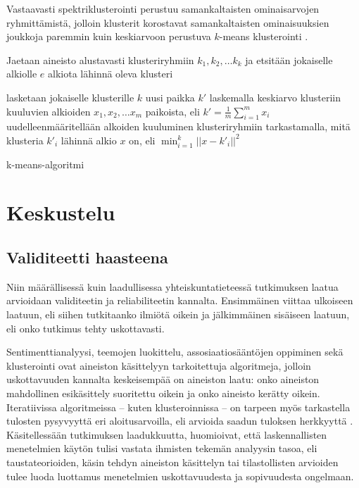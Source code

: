 \documentclass[finnish,gradu,twoside,12pt]{tktltiki}
\begin{document}
{Vastaavasti spektriklusterointi perustuu samankaltaisten ominaisarvojen ryhmittämistä, jolloin klusterit korostavat samankaltaisten ominaisuuksien joukkoja paremmin kuin keskiarvoon perustuva $k$-means klusterointi \citep[485--586]{Hastie2009}.

\begin{algorithm}
\begin{algorithmic}

\State Jaetaan aineisto alustavasti klusteriryhmiin $k_1, k_2, \ldots k_k$ ja etsitään jokaiselle alkiolle $e$ alkiota lähinnä oleva klusteri


\State lasketaan jokaiselle klusterille $k$ uusi paikka $k'$ laskemalla keskiarvo klusteriin kuuluvien alkioiden $x_{1}, x_{2}, \ldots x_{m}$ paikoista, eli $k' = \frac{1}{m} \sum_{i=1}^m x_i $
\State uudelleenmääritellään alkoiden kuuluminen klusteriryhmiin tarkastamalla, mitä klusteria $k'_i$ lähinnä alkio $x$ on, eli $\min_{i=1}^k || x - k'_i || ^ 2$

\EndWhile

\end{algorithmic}
\caption{k-means-algoritmi}
\label{algo:kmeans}
\end{algorithm}


\section{Keskustelu}

\subsection{Validiteetti haasteena}

Niin määrällisessä kuin laadullisessa yhteiskuntatieteessä tutkimuksen laatua arvioidaan validiteetin ja reliabiliteetin kannalta. Ensimmäinen viittaa ulkoiseen laatuun, eli siihen tutkitaanko ilmiötä oikein ja jälkimmäinen sisäiseen laatuun, eli onko tutkimus tehty uskottavasti.

Sentimenttianalyysi, teemojen luokittelu, assosiaatiosääntöjen oppiminen sekä klusterointi ovat aineiston käsittelyyn tarkoitettuja algoritmeja, jolloin uskottavuuden kannalta keskeisempää on aineiston laatu: onko aineiston mahdollinen esikäsittely suoritettu oikein ja onko aineisto kerätty oikein. Iteratiivissa algoritmeissa -- kuten klusteroinnissa -- on tarpeen myös tarkastella tulosten pysyvyyttä eri aloitusarvoilla, eli arvioida saadun tuloksen herkkyyttä . Käsitellessään tutkimuksen laadukkuutta, \citet{Grimmer2013} huomioivat, että laskennallisten menetelmien käytön tulisi vastata ihmisten tekemän analyysin tasoa, eli taustateorioiden, käsin tehdyn aineiston käsittelyn tai tilastollisten arvioiden tulee luoda luottamus menetelmien uskottavuudesta ja sopivuudesta ongelmaan.

}
\end{document}
